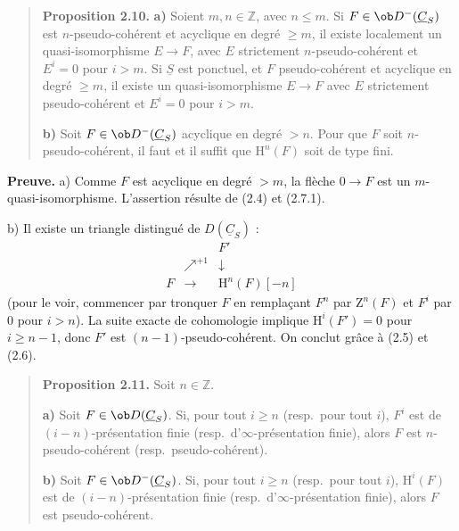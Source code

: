 \begin{quote}
\textbf{Proposition 2.10.} \textbf{a)} Soient $m, n \in \mathbb{Z}$, avec $n \leqslant m$. Si $F \in \ob D^-(\underline{C}_S)$ est $n$-pseudo-cohérent et acyclique en degré $\geqslant m$, il existe localement un quasi-isomorphisme $E \to F$, avec $E$ strictement $n$-pseudo-cohérent et $E^i = 0$ pour $i > m$. Si $\underline{S}$ est ponctuel, et $F$ pseudo-cohérent et acyclique en degré $\geqslant m$, il existe un quasi-isomorphisme $E \to F$ avec $E$ strictement pseudo-cohérent et $E^i = 0$ pour $i > m$.

\textbf{b)} Soit $F \in \ob D^-(\underline{C}_S)$ acyclique en degré $> n$. Pour que $F$ soit $n$-pseudo-cohérent, il faut et il suffit que $\mathrm{H}^n(F)$ soit de type fini.
\end{quote}

\textbf{Preuve.} a) Comme $F$ est acyclique en degré $> m$, la flèche $0 \to F$ est un $m$-quasi-isomorphisme. L'assertion résulte de (2.4) et (2.7.1).

b) Il existe un triangle distingué de $D(\underline{C}_S)$ :
\[
\begin{array}{ccc}
& & F' \\
& \nearrow^{+1} & \downarrow \\
F & \longrightarrow & \mathrm{H}^n(F)[-n]
\end{array}
\]
(pour le voir, commencer par tronquer $F$ en remplaçant $F^n$ par $\mathrm{Z}^n(F)$ et $F^i$ par $0$ pour $i > n$). La suite exacte de cohomologie implique $\mathrm{H}^i(F') = 0$ pour $i \geqslant n-1$, donc $F'$ est $(n-1)$-pseudo-cohérent. On conclut grâce à (2.5) et (2.6).

\begin{quote}
\textbf{Proposition 2.11.} Soit $n \in \mathbb{Z}$.

\textbf{a)} Soit $F \in \ob D(\underline{C}_S)$. Si, pour tout $i \geqslant n$ (resp.\ pour tout $i$), $F^i$ est de $(i-n)$-présentation finie (resp.\ d'$\infty$-présentation finie), alors $F$ est $n$-pseudo-cohérent (resp.\ pseudo-cohérent).

\textbf{b)} Soit $F \in \ob D^-(\underline{C}_S)$. Si, pour tout $i \geqslant n$ (resp.\ pour tout $i$), $\mathrm{H}^i(F)$ est de $(i-n)$-présentation finie (resp.\ d'$\infty$-présentation finie), alors $F$ est pseudo-cohérent.
\end{quote}

